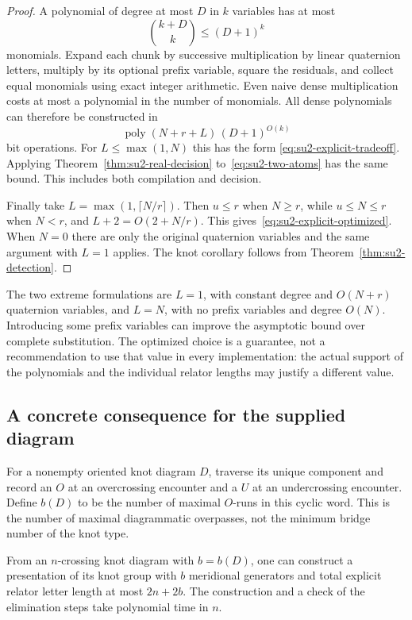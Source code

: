 \begin{proof}
A polynomial of degree at most $D$ in $k$ variables has at most
\[
 \binom{k+D}{k}\leq(D+1)^k
\]
monomials.  Expand each chunk by successive multiplication by linear
quaternion letters, multiply by its optional prefix variable, square the
residuals, and collect equal monomials using exact integer arithmetic.
Even naive dense multiplication costs at most a polynomial in the number
of monomials.  All dense polynomials can therefore be constructed in
\[
 \operatorname{poly}(N+r+L)\,(D+1)^{O(k)}
\]
bit operations.  For $L\leq\max(1,N)$ this has the form
\eqref{eq:su2-explicit-tradeoff}.  Applying
Theorem~\ref{thm:su2-real-decision} to~\eqref{eq:su2-two-atoms} has the
same bound.  This includes both compilation and decision.

Finally take $L=\max(1,\lceil N/r\rceil)$.  Then $u\leq r$ when
$N\geq r$, while $u\leq N\leq r$ when $N<r$, and
$L+2=O(2+N/r)$.  This gives~\eqref{eq:su2-explicit-optimized}.
When $N=0$ there are only the original quaternion variables and the same
argument with $L=1$ applies.  The knot corollary follows from
Theorem~\ref{thm:su2-detection}.
\end{proof}

\begin{remark}
The two extreme formulations are $L=1$, with constant degree and
$O(N+r)$ quaternion variables, and $L=N$, with no prefix variables and
degree $O(N)$.  Introducing some prefix variables can improve the
asymptotic bound over complete substitution.  The optimized choice is a
guarantee, not a recommendation to use that value in every implementation:
the actual support of the polynomials and the individual relator lengths
may justify a different value.
\end{remark}

\subsection{A concrete consequence for the supplied diagram}

For a nonempty oriented knot diagram $D$, traverse its unique component
and record an $O$ at an overcrossing encounter and a $U$ at an
undercrossing encounter.  Define $b(D)$ to be the number of maximal
$O$-runs in this cyclic word.  This is the number of maximal diagrammatic
overpasses, not the minimum bridge number of the knot type.

\begin{lemma}
\label{lem:su2-overpass}
From an $n$-crossing knot diagram with $b=b(D)$, one can construct a
presentation of its knot group with $b$ meridional generators and total
explicit relator letter length at most $2n+2b$.  The construction and a
check of the elimination steps take polynomial time in $n$.
\end{lemma}

